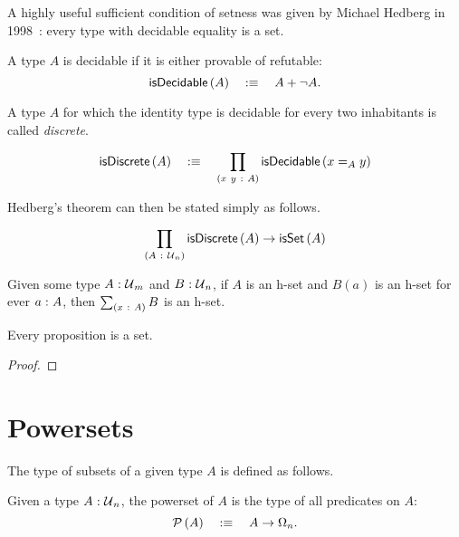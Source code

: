 A highly useful sufficient condition of setness was given by Michael Hedberg in
1998~\cite{hedberg}: every type with decidable equality is a set.
\begin{defn}[Decidability]
  A type $A$ is decidable if it is either provable of refutable:
  \begin{equation*}
    \mathsf{isDecidable}\left(A\right) \quad:\equiv\quad A + \neg A.
  \end{equation*}
\end{defn}

A type $A$ for which the identity type is decidable for every two inhabitants is called
\emph{discrete}.
\begin{defn}[Discrete]
  \begin{equation*}
    \mathsf{isDiscrete}\left(A\right) \quad:\equiv\quad \prod_{(x~y~:~A)} \mathsf{isDecidable}\left(x =_A y\right)
  \end{equation*}
\end{defn}

Hedberg's theorem can then be stated simply as follows.
\begin{thm}[Hedberg]\label{thm:hedberg}
  \begin{equation*}
    \prod_{(A~:~\mathcal{U}{}_n)} \mathsf{isDiscrete}\left(A\right) \rightarrow \mathsf{isSet}\left(A\right)
  \end{equation*}
\end{thm}

\begin{prop}\label{prop:sigma-set}
  Given some type $A\hspace{0.1mm}:\hspace{0.1mm}\mathcal{U}{}_m$ and $B\hspace{0.1mm}:\hspace{0.1mm}\mathcal{U}{}_n$, if $A$ is an h-set
  and $B(a)$ is an h-set for ever $a\hspace{0.1mm}:\hspace{0.1mm}A$, then $\sum_{(x~:~A)} B$ is an h-set.
\end{prop}

\begin{prop}\label{prop:prop-is-set}
  Every proposition is a set.
\end{prop}
\begin{proof}
\end{proof}

\section{Powersets}

The type of subsets of a given type $A$ is defined as follows.

\begin{defn}\label{defn:pow}
  Given a type $A\hspace{0.1mm}:\hspace{0.1mm}\mathcal{U}{}_n$, the powerset of $A$ is the type of all predicates
  on $A$:
  \begin{equation*}
    \mathcal{P}\left(A\right) \quad:\equiv\quad A \rightarrow \Omega_n.
  \end{equation*}
\end{defn}

